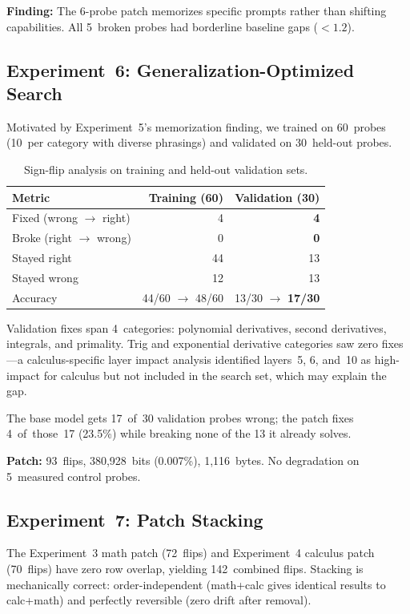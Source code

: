 \documentclass[11pt,a4paper]{article}
\begin{document}
\textbf{Finding:} The 6-probe patch memorizes specific prompts rather
than shifting capabilities. All 5~broken probes had borderline baseline
gaps ($< 1.2$).

\subsection{Experiment~6: Generalization-Optimized Search}

Motivated by Experiment~5's memorization finding, we trained on
60~probes (10~per category with diverse phrasings) and validated on
30~held-out probes.

\begin{table}[h]
\centering
\caption{Sign-flip analysis on training and held-out validation sets.}
\begin{tabular}{@{}lrr@{}}
\toprule
Metric & Training (60) & Validation (30) \\
\midrule
Fixed (wrong $\to$ right) & 4 & \textbf{4} \\
Broke (right $\to$ wrong) & 0 & \textbf{0} \\
Stayed right & 44 & 13 \\
Stayed wrong & 12 & 13 \\
\midrule
Accuracy & 44/60 $\to$ 48/60 & 13/30 $\to$ \textbf{17/30} \\
\bottomrule
\end{tabular}
\end{table}

Validation fixes span 4~categories: polynomial derivatives, second
derivatives, integrals, and primality. Trig and exponential derivative
categories saw zero fixes---a calculus-specific layer impact analysis
identified layers~5, 6, and~10 as high-impact for calculus but not
included in the search set, which may explain the gap.

The base model gets 17~of~30 validation probes wrong; the patch fixes
4~of~those~17 (23.5\%) while breaking none of the 13 it already solves.

\textbf{Patch:} 93~flips, 380,928~bits (0.007\%), 1,116~bytes.
No degradation on 5~measured control probes.

\subsection{Experiment~7: Patch Stacking}

The Experiment~3 math patch (72~flips) and Experiment~4 calculus patch
(70~flips) have zero row overlap, yielding 142~combined flips.
Stacking is mechanically correct: order-independent (math+calc gives
identical results to calc+math) and perfectly reversible (zero drift
after removal).
\end{document}
